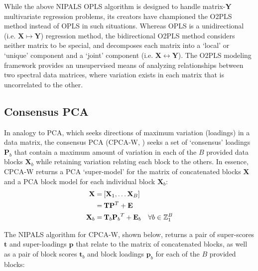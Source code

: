 \begin{doublespace}
While the above NIPALS OPLS algorithm is designed to handle matrix-$\mathbf{Y}$
multivariate regression problems, its creators have championed the O2PLS
\cite{trygg:jchemo2003} method instead of OPLS in such situations. Whereas OPLS
is a unidirectional (i.e. $\mathbf{X} \mapsto \mathbf{Y}$) regression method,
the bidirectional O2PLS method considers neither matrix to be special, and
decomposes each matrix into a `local' or `unique' component and a `joint'
component (i.e. $\mathbf{X} \leftrightarrow \mathbf{Y}$). The O2PLS modeling
framework provides an unsupervised means of analyzing relationships between
two spectral data matrices, where variation exists in each matrix that is
uncorrelated to the other.
\end{doublespace}

\subsection{Consensus PCA}

\begin{doublespace}
In analogy to PCA, which seeks directions of maximum variation (loadings) in a
data matrix, the consensus PCA (CPCA-W,
\cite{westerhuis:jchemo1998,smilde:jchemo2003}) seeks
a set of `consensus' loadings $\mathbf{P}_b$ that contain a maximum amount
of variation in each of the $B$ provided data blocks $\mathbf{X}_b$ while
retaining variation relating each block to the others. In essence, CPCA-W
returns a PCA `super-model' for the matrix of concatenated blocks $\mathbf{X}$
and a PCA block model for each individual block $\mathbf{X}_b$:
\begin{align}
\mathbf{X} =& \: [\mathbf{X}_1, \dots \mathbf{X}_B] \\
           =& \: \mathbf{T} \mathbf{P}^T + \mathbf{E} \\
\mathbf{X}_b =& \: \mathbf{T}_b {\mathbf{P}_b}^T + \mathbf{E}_b
 \quad \forall b \in \mathbb{Z}_{1}^{B}
\end{align}

The NIPALS algorithm for CPCA-W, shown below, returns a pair of super-scores
$\mathbf{t}$ and super-loadings $\mathbf{p}$ that relate to the matrix of
concatenated blocks, as well as a pair of block scores $\mathbf{t}_b$ and
block loadings $\mathbf{p}_b$ for each of the $B$ provided blocks:
\end{doublespace}

